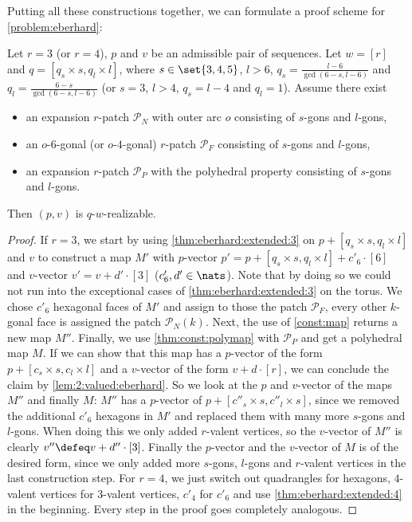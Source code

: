 Putting all these constructions together, we can formulate a proof scheme for \autoref{problem:eberhard}:
\begin{proposition}\label{thm:main:const} Let $r = 3$ (or $r = 4$), $p$ and $v$ be an admissible pair of sequences. Let $w = [r]$ and $q = [q_s \times s, q_l \times l]$, where $s \in \set{3, 4, 5}$, $l > 6$, $q_s = \frac{l - 6}{\gcd(6 - s, l - 6)}$ and $q_l = \frac{6 - s}{\gcd(6 - s, l - 6)}$ (or $s = 3$, $l > 4$, $q_s = l - 4$ and $q_l = 1$). Assume there exist
  \begin{itemize}
  \item an expansion $r$-patch $\mathcal{P}_N$ with outer arc $o$ consisting of $s$-gons and $l$-gons,
  \item an $o$-$6$-gonal (or $o$-$4$-gonal) $r$-patch $\mathcal{P}_F$ consisting of $s$-gons and $l$-gons,
  \item an expansion $r$-patch $\mathcal{P}_P$ with the polyhedral property consisting of $s$-gons and $l$-gons.
  \end{itemize}
  Then $(p, v)$ is $q$-$w$-realizable.
  \begin{proof}
    If $r = 3$, we start by using \autoref{thm:eberhard:extended:3} on $p + [q_s \times s, q_l \times l]$ and $v$ to construct a map $M'$ with $p$-vector $p' = p + [q_s \times s, q_l \times l] + c'_6 \cdot [6]$ and $v$-vector $v' = v + d' \cdot [3]$ ($c'_6, d' \in \nats$). Note that by doing so we could not run into the exceptional cases of \autoref{thm:eberhard:extended:3} on the torus. We chose $c'_6$ hexagonal faces of $M'$ and assign to those the patch $\mathcal{P}_F$, every other $k$-gonal face is assigned the patch $\mathcal{P}_N(k)$. Next, the use of \autoref{const:map} returns a new map $M''$. Finally, we use \autoref{thm:const:polymap} with $\mathcal{P}_P$ and get a polyhedral map $M$. If we can show that this map has a $p$-vector of the form $p +  [c_s \times s, c_l \times l]$ and a $v$-vector of the form $v + d \cdot [r]$, we can conclude the claim by \autoref{lem:2:valued:eberhard}. So we look at the $p$ and $v$-vector of the maps $M''$ and finally $M$: $M''$ has a $p$-vector of $p + [c''_s \times s, c''_l \times s]$, since we removed the additional $c'_6$ hexagons in $M'$ and replaced them with many more $s$-gons and $l$-gons. When doing this we only added $r$-valent vertices, so the $v$-vector of $M''$ is clearly $v'' \defeq v + d'' \cdot [3]$. Finally the $p$-vector and the $v$-vector of $M$ is of the desired form, since we only added more $s$-gons, $l$-gons and $r$-valent vertices in the last construction step. For $r = 4$, we just switch out quadrangles for hexagons, $4$-valent vertices for $3$-valent vertices, $c'_4$ for $c'_6$ and use \autoref{thm:eberhard:extended:4} in the beginning. Every step in the proof goes completely analogous.
  \end{proof}
\end{proposition}

